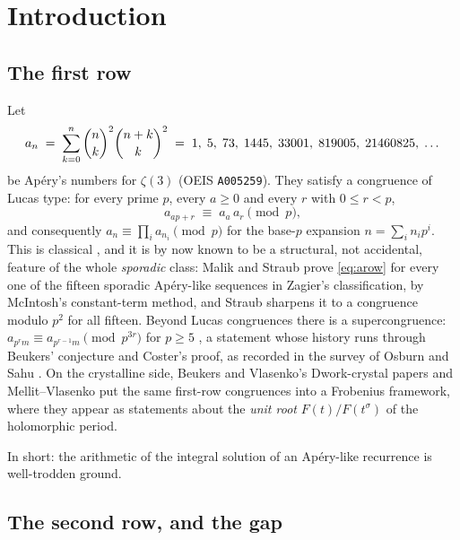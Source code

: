 \section{Introduction}
\label{sec:intro}

\subsection{The first row}
\label{ssec:firstrow}

Let
\begin{equation}\label{eq:apery-a}
  a_n \;=\; \sum_{k=0}^{n}\binom{n}{k}^2\binom{n+k}{k}^2
  \;=\;1,\;5,\;73,\;1445,\;33001,\;819005,\;21460825,\;\dots
\end{equation}
be Ap\'ery's numbers for $\zeta(3)$ (OEIS \texttt{A005259}). They satisfy a congruence of
Lucas type: for every prime $p$, every $a\ge 0$ and every $r$ with $0\le r<p$,
\begin{equation}\label{eq:arow}
  a_{ap+r}\;\equiv\;a_a\,a_r \pmod p ,
\end{equation}
and consequently $a_n\equiv\prod_i a_{n_i}\pmod p$ for the base-$p$ expansion
$n=\sum_i n_ip^i$. This is classical \cite{Gessel1982}, and it is by now known
to be a structural, not accidental, feature of the whole \emph{sporadic} class:
Malik and Straub \cite[Thm.~3.1]{MalikStraub} prove \eqref{eq:arow} for every one of the
fifteen sporadic Ap\'ery-like sequences in Zagier's classification, by McIntosh's
constant-term method, and Straub \cite{Straub2301} sharpens it to a congruence modulo
$p^2$ for all fifteen. Beyond Lucas congruences there is a supercongruence:
$a_{p^rm}\equiv a_{p^{r-1}m}\pmod{p^{3r}}$ for $p\ge 5$
\cite[Thm.~3.2]{Straub1401}, a statement whose history runs through Beukers' conjecture
and Coster's proof, as recorded in the survey of Osburn and Sahu \cite{OsburnSahu}. On the
crystalline side, Beukers and Vlasenko's Dwork-crystal papers
\cite{BVone,BVtwo,BVthree} and Mellit--Vlasenko \cite{MellitVlasenko} put the same
first-row congruences into a Frobenius framework, where they appear as statements about
the \emph{unit root} $F(t)/F(t^\sigma)$ of the holomorphic period.

In short: the arithmetic of the integral solution of an Ap\'ery-like recurrence is
well-trodden ground.

\subsection{The second row, and the gap}
\label{ssec:gap}

